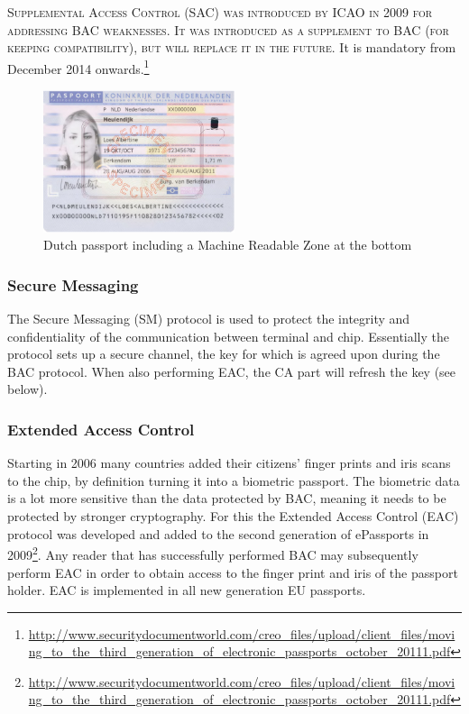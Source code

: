 \textsc{Supplemental Access Control (SAC) was introduced by ICAO in 2009 for addressing BAC weaknesses. It was introduced as a supplement to BAC (for keeping compatibility), but will replace it in the future.} It is mandatory from December 2014 onwards.\footnote{\url{http://www.securitydocumentworld.com/creo_files/upload/client_files/moving_to_the_third_generation_of_electronic_passports_october_20111.pdf}}

\begin{figure}[htb]
	\centering
		\includegraphics[width=0.50\textwidth]{images/dutchpassport.png}
	\caption{Dutch passport including a Machine Readable Zone at the bottom}
	\label{fig:dutchpassport}
\end{figure}

\subsubsection{Secure Messaging}
The Secure Messaging (SM) protocol is used to protect the integrity and confidentiality of the communication between terminal and chip. Essentially the protocol sets up a secure channel, the key for which is agreed upon during the BAC protocol. When also performing EAC, the CA part will refresh the key (see below).

\subsubsection{Extended Access Control}
Starting in 2006 many countries added their citizens' finger prints and iris scans to the chip, by definition turning it into a biometric passport. The biometric data is a lot more sensitive than the data protected by BAC, meaning it needs to be protected by stronger cryptography. For this the Extended Access Control (EAC) protocol was developed and added to the second generation of ePassports in 2009\footnote{\url{http://www.securitydocumentworld.com/creo_files/upload/client_files/moving_to_the_third_generation_of_electronic_passports_october_20111.pdf}}. Any reader that has successfully performed BAC may subsequently perform EAC in order to obtain access to the finger print and iris of the passport holder. EAC is implemented in all new generation EU passports.

